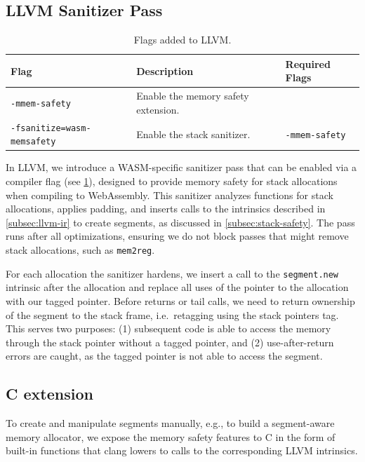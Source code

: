 \subsection{LLVM Sanitizer Pass}
\label{subsec:llvm-sanitizer-pass}

\begin{table}[h]
  \centering
  \caption{Flags added to LLVM.}
  \label{tab:llvm-flags}
  \begin{tabular}{l | l | l}
    \textbf{Flag} & \textbf{Description} & \textbf{Required Flags} \\
    \hline
    \texttt{-mmem-safety}              & Enable the memory safety extension. & \\
    \texttt{-fsanitize=wasm-memsafety} & Enable the stack sanitizer. & \texttt{-mmem-safety} \\
  \end{tabular}
\end{table}

In LLVM, we introduce a \ac{WASM}-specific sanitizer pass that can be enabled via a compiler flag (see \cref{tab:llvm-flags}), designed to provide memory safety for stack allocations when compiling to WebAssembly.
This sanitizer analyzes functions for stack allocations, applies padding, and inserts calls to the intrinsics described in \cref{subsec:llvm-ir} to create segments, as discussed in \cref{subsec:stack-safety}.
The pass runs after all optimizations, ensuring we do not block passes that might remove stack allocations, such as \texttt{mem2reg}.

For each allocation the sanitizer hardens, we insert a call to the \texttt{segment.new} intrinsic after the allocation and replace all uses of the pointer to the allocation with our tagged pointer.
Before returns or tail calls, we need to return ownership of the segment to the stack frame, i.e.\ retagging using the stack pointers tag.
This serves two purposes: (1) subsequent code is able to access the memory through the stack pointer without a tagged pointer, and (2) use-after-return errors are caught, as the tagged pointer is not able to access the segment.

\subsection{C extension}
\label{subsec:c-extension}

To create and manipulate segments manually, e.g., to build a segment-aware memory allocator, we expose the memory safety features to C in the form of built-in functions that clang lowers to calls to the corresponding LLVM intrinsics.

